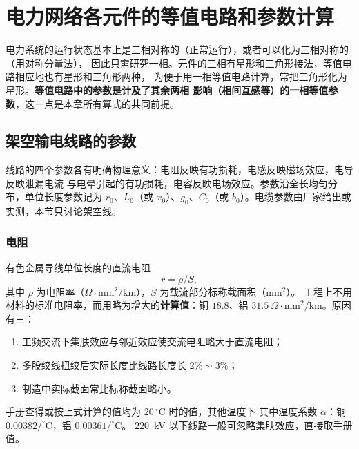 ﻿%

\chapter{电力网络各元件的等值电路和参数计算}

电力系统的运行状态基本上是三相对称的（正常运行），或者可以化为三相对称的（用对称分量法），
因此只需研究一相。元件的三相有星形和三角形接法，等值电路相应地也有星形和三角形两种，
为便于用一相等值电路计算，常把三角形化为星形。\textbf{等值电路中的参数是计及了其余两相
影响（相间互感等）的一相等值参数}，这一点是本章所有算式的共同前提。

\section{架空输电线路的参数}

线路的四个参数各有明确物理意义：电阻反映有功损耗，电感反映磁场效应，电导反映泄漏电流
与电晕引起的有功损耗，电容反映电场效应。参数沿全长均匀分布，单位长度参数记为
$r_0$、$L_0$（或 $x_0$）、$g_0$、$C_0$（或 $b_0$）。电缆参数由厂家给出或实测，本节只讨论架空线。

\subsection{电阻}

有色金属导线单位长度的直流电阻
\begin{equation}
  r=\rho/S ,
\end{equation}
其中 $\rho$ 为电阻率（$\Omega\cdot\text{mm}^2/\text{km}$），$S$ 为载流部分标称截面积（$\text{mm}^2$）。
工程上不用材料的标准电阻率，而用略为增大的\textbf{计算值}：铜 $18.8$、铝 $31.5\
\Omega\cdot\text{mm}^2/\text{km}$。原因有三：
\begin{enumerate}
  \item 工频交流下集肤效应与邻近效应使交流电阻略大于直流电阻；
  \item 多股绞线扭绞后实际长度比线路长度长 $2\%\sim3\%$；
  \item 制造中实际截面常比标称截面略小。
\end{enumerate}

手册查得或按上式计算的值均为 $20\,^\circ$C 时的值，其他温度下
其中温度系数 $\alpha$：铜 $0.00382/^\circ$C，铝 $0.00361/^\circ$C。
$220$~kV 以下线路一般可忽略集肤效应，直接取手册值。

